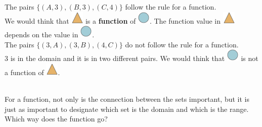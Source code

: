 \documentclass{ximera}
\begin{document}
\begin{example}
The pairs $\{ (A, 3), (B, 3), (C, 4) \}$ follow the rule for a function. \\
We would think that \includegraphics{pics/triangle.png} is a \textbf{function} of \includegraphics{pics/circle.png}. The function value in \includegraphics{pics/triangle.png} depends on the value in \includegraphics{pics/circle.png}. \\


The pairs $\{ (3, A), (3, B), (4, C) \}$ do not follow the rule for a function.  \\
3 is in the domain and it is in two different pairs. We would think that \includegraphics{pics/circle.png} is not a function of \includegraphics{pics/triangle.png}.

\end{example}

\quad \\


For a function, not only is the connection between the sets important, but it is just as important to designate which set is the domain and which is the range. \\
Which way does the function go?
\end{document}
